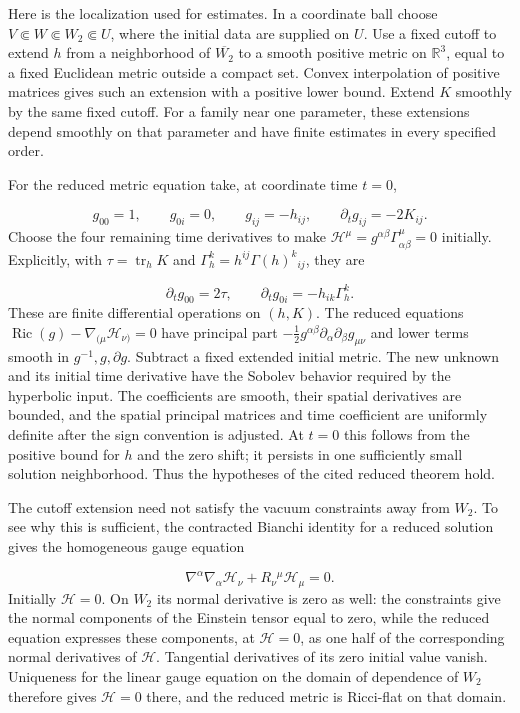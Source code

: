 \documentclass[
  english,
  11pt,
  reqno]{amsart}
\begin{document}
Here is the localization used for estimates. In a coordinate ball choose
\(V\Subset W\Subset W_2\Subset U\), where the initial data are supplied
on \(U\). Use a fixed cutoff to extend \(h\) from a neighborhood of
\(\overline{W_2}\) to a smooth positive metric on \(\mathbb R^3\), equal
to a fixed Euclidean metric outside a compact set. Convex interpolation
of positive matrices gives such an extension with a positive lower
bound. Extend \(K\) smoothly by the same fixed cutoff. For a family near
one parameter, these extensions depend smoothly on that parameter and
have finite estimates in every specified order.

For the reduced metric equation take, at coordinate time \(t=0\),

\label{eq:online-harmonic-initial-tensors} \[
g_{00}=1,\qquad g_{0i}=0,\qquad g_{ij}=-h_{ij},
\qquad
\partial_tg_{ij}=-2K_{ij}.
\] Choose the four remaining time derivatives to make
\(\mathcal H^\mu=g^{\alpha\beta}\Gamma^\mu_{\alpha\beta}=0\) initially.
Explicitly, with \(\tau=\operatorname{tr}_hK\) and
\(\Gamma_h^k=h^{ij}\Gamma(h)^k{}_{ij}\), they are

\label{eq:online-harmonic-initial-gauge} \[
\partial_tg_{00}=2\tau,\qquad
\partial_tg_{0i}=-h_{ik}\Gamma_h^k.
\] These are finite differential operations on \((h,K)\). The reduced
equations \(\operatorname{Ric}(g)-\nabla_{(\mu}\mathcal H_{\nu)}=0\)
have principal part
\(-\frac12g^{\alpha\beta}\partial_\alpha\partial_\beta g_{\mu\nu}\) and
lower terms smooth in \(g^{-1},g,\partial g\). Subtract a fixed extended
initial metric. The new unknown and its initial time derivative have the
Sobolev behavior required by the hyperbolic input. The coefficients are
smooth, their spatial derivatives are bounded, and the spatial principal
matrices and time coefficient are uniformly definite after the sign
convention is adjusted. At \(t=0\) this follows from the positive bound
for \(h\) and the zero shift; it persists in one sufficiently small
solution neighborhood. Thus the hypotheses of the cited reduced theorem
hold.

The cutoff extension need not satisfy the vacuum constraints away from
\(W_2\). To see why this is sufficient, the contracted Bianchi identity
for a reduced solution gives the homogeneous gauge equation

\label{eq:online-harmonic-gauge-propagation} \[
\nabla^\alpha\nabla_\alpha\mathcal H_\nu
+R_\nu{}^\mu\mathcal H_\mu=0.
\] Initially \(\mathcal H=0\). On \(W_2\) its normal derivative is zero
as well: the constraints give the normal components of the Einstein
tensor equal to zero, while the reduced equation expresses these
components, at \(\mathcal H=0\), as one half of the corresponding normal
derivatives of \(\mathcal H\). Tangential derivatives of its zero
initial value vanish. Uniqueness for the linear gauge equation on the
domain of dependence of \(W_2\) therefore gives \(\mathcal H=0\) there,
and the reduced metric is Ricci-flat on that domain.
\end{document}
